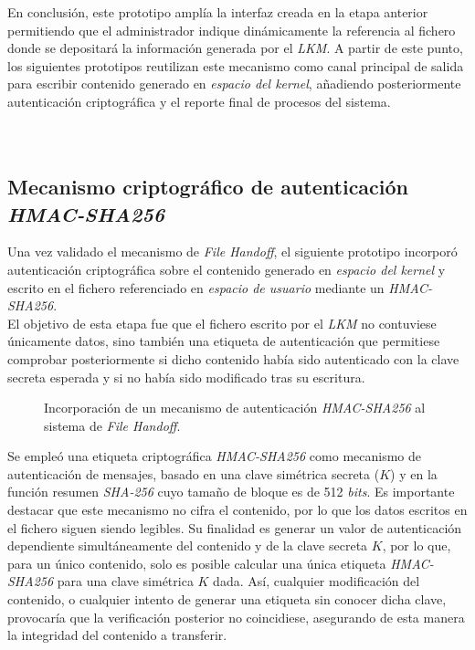 En conclusión, este prototipo amplía la interfaz creada en la etapa anterior permitiendo que el administrador indique dinámicamente la referencia al fichero donde se depositará la información generada por el \textit{LKM}.
A partir de este punto, los siguientes prototipos reutilizan este mecanismo como canal principal de salida para escribir contenido generado en \textit{espacio del kernel}, añadiendo posteriormente autenticación criptográfica y el reporte final de procesos del sistema.\\\\

\

\subsection{Mecanismo criptográfico de autenticación \textit{HMAC-SHA256}}

Una vez validado el mecanismo de \textit{File Handoff}, el siguiente prototipo incorporó autenticación criptográfica sobre el contenido generado en \textit{espacio del kernel} y escrito en el fichero referenciado en \textit{espacio de usuario} mediante un \textit{HMAC-SHA256}.\\

El objetivo de esta etapa fue que el fichero escrito por el \textit{LKM} no contuviese únicamente datos, sino también una etiqueta de autenticación que permitiese comprobar posteriormente si dicho contenido había sido autenticado con la clave secreta esperada y si no había sido modificado tras su escritura.\\

\newpage

\begin{figure}[h!]
  \centering
  \scalebox{1}{}
  \caption{Incorporación de un mecanismo de autenticación \textit{HMAC-SHA256} al sistema de \textit{File Handoff}.}
  \label{fig:crypto_hmac_scheme}
\end{figure}

Se empleó una etiqueta criptográfica \textit{HMAC-SHA256} como mecanismo de autenticación de mensajes, basado en una clave simétrica secreta (\(K\)) y en la función resumen \textit{SHA-256} cuyo tamaño de bloque es de 512 \textit{bits}.
Es importante destacar que este mecanismo no cifra el contenido, por lo que los datos escritos en el fichero siguen siendo legibles.
Su finalidad es generar un valor de autenticación dependiente simultáneamente del contenido y de la clave secreta \(K\), por lo que, para un único contenido, solo es posible calcular una única etiqueta \textit{HMAC-SHA256} para una clave simétrica \(K\) dada.
Así, cualquier modificación del contenido, o cualquier intento de generar una etiqueta sin conocer dicha clave, provocaría que la verificación posterior no coincidiese, asegurando de esta manera la integridad del contenido a transferir.\\

